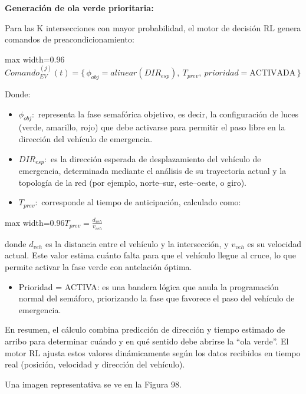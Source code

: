 \documentclass[12pt,a4paper,oneside]{report}
\newenvironment{centeredmath}
  {\begin{center}\begin{adjustbox}{max width=0.96\linewidth}\(\displaystyle}
  {\)\end{adjustbox}\end{center}}
\begin{document}
\textbf{Generación de ola verde prioritaria:}

Para las K intersecciones con mayor probabilidad, el motor de decisión RL genera comandos de preacondicionamiento:

\begin{centeredmath}
Comando_{EV}^{(j)}(t) = \{\, \phi_{obj} = alinear(DIR_{esp}),\ T_{prev},\ prioridad = \text{ACTIVADA} \,\}
\end{centeredmath}

Donde:

\begin{itemize}
\item
  \(\phi_{obj}:\) representa la fase semafórica objetivo, es decir, la configuración de luces (verde, amarillo, rojo) que debe activarse para permitir el paso libre en la dirección del vehículo de emergencia.
\item
  \(DIR_{esp}:\) es la dirección esperada de desplazamiento del vehículo de emergencia, determinada mediante el análisis de su trayectoria actual y la topología de la red (por ejemplo, norte--sur, este--oeste, o giro).
\item
  \(T_{prev}:\) corresponde al tiempo de anticipación, calculado como:
\end{itemize}

\begin{centeredmath}
T_{prev} = \frac{d_{veh}}{v_{veh}}
\end{centeredmath}

donde \(d_{veh}\) es la distancia entre el vehículo y la intersección, y \(v_{veh}\)\hspace{0pt} es su velocidad actual. Este valor estima cuánto falta para que el vehículo llegue al cruce, lo que permite activar la fase verde con antelación óptima.

\begin{itemize}
\item
  Prioridad = ACTIVA: es una bandera lógica que anula la programación normal del semáforo, priorizando la fase que favorece el paso del vehículo de emergencia.
\end{itemize}

En resumen, el cálculo combina predicción de dirección y tiempo estimado de arribo para determinar cuándo y en qué sentido debe abrirse la ``ola verde''. El motor RL ajusta estos valores dinámicamente según los datos recibidos en tiempo real (posición, velocidad y dirección del vehículo).

Una imagen representativa se ve en la Figura 98.
\end{document}
